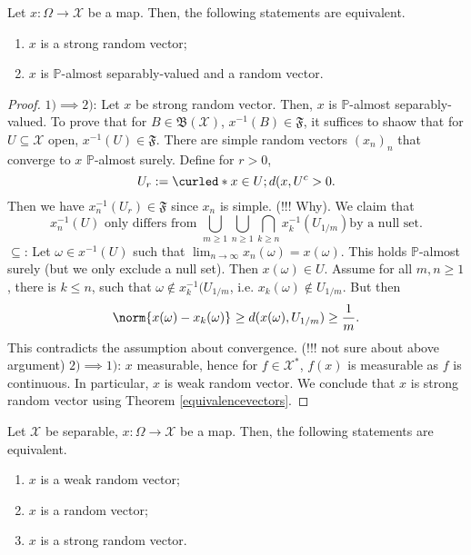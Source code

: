 \begin{thm}
    Let \( x: \Omega \to \mathcal{X} \) be a map. Then, the following statements are equivalent.
    \begin{enumerate}[1)]
      \item \( x \) is a strong random vector;
      \item \( x \) is \( \mathbb{P} \)-almost separably-valued and a random vector.
    \end{enumerate}
    
\end{thm}

\begin{proof}
   \( 1) \implies 2) \): Let \( x \) be strong random vector. Then, \( x \) is \( \mathbb{P} \)-almost separably-valued. To prove that for \( B \in \mathfrak{B}(\mathcal{X}) \), \( x^{-1}(B) \in \mathfrak{F} \), it suffices to shaow that for \( U \subseteq \mathcal{X} \) open, \( x^{-1}(U) \in \mathfrak{F} \). There are simple random vectors \( (x_n)_n \) that converge to \( x \) \( \mathbb{P} \)-almost surely. Define for \( r >0 \), 
   \[ U_r:= \curled*{x \in U; d(x,U^{c}}>0. \]
   Then we have \( x_n^{-1}(U_r ) \in \mathfrak{F}\) since \( x_n \) is simple. (!!! Why). We claim that 
   \[ x_n^{-1}(U) \text{ only differs from } \bigcup_{m\geq 1} \bigcup_{n\geq 1} \bigcap_{k \geq n} x_k^{-1}(U_{1/m}) \text{by a null set}.\]
   \( \subseteq  \): Let \( \omega \in x^{-1}(U) \) such that \( \lim_{n \to \infty} x_n(\omega ) = x(\omega )\). This holds \( \mathbb{P} \)-almost surely (but we only exclude a null set). Then \( x(\omega ) \in U \). Assume for all \( m,n \geq 1 \), there is \( k \leq n \), such that \( \omega \notin x_k^{-1}(U_{1/m} \), i.e. \( x_k(\omega ) \notin U_{1/m} \). But then
   \[ \norm{x(\omega )-x_k(\omega )}_{} \geq d(x(\omega ), U_{1/m}) \geq \frac{1}{m} .\] 
   This contradicts the assumption about convergence.
   (!!! not sure about above argument)
   \( 2) \implies 1) \): \( x \) measurable, hence for \( f \in \mathcal{X}^{*} \), \( f(x) \) is measurable as \( f \) is continuous. In particular, \( x \) is weak random vector. We conclude that \( x \) is strong random vector using Theorem \ref{equivalencevectors}.
\end{proof}

\begin{corl}
    Let \( \mathcal{X} \) be separable, \( x: \Omega \to \mathcal{X} \) be a map. Then, the following statements are equivalent.
    \begin{enumerate}[1)]
      \item \( x \) is a weak random vector;
      \item \( x \) is a random vector;
      \item \( x \) is a strong random vector.
    \end{enumerate}
    
\end{corl}



